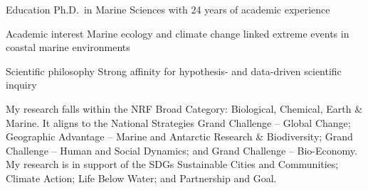


\begin{cvskills}


\cvskill
{Education} %
{Ph.D.~in Marine Sciences with 24 years of academic experience} %


\cvskill
{Academic interest} %
{Marine ecology and climate change linked extreme events in coastal marine environments} %


\cvskill
{Scientific philosophy} %
{Strong affinity for hypothesis- and data-driven scientific inquiry} %


\end{cvskills}

My research falls within the NRF Broad Category: Biological, Chemical, Earth & Marine. It aligns to the National Strategies Grand Challenge – Global Change; Geographic Advantage – Marine and Antarctic Research \& Biodiversity; Grand Challenge – Human and Social Dynamics; and Grand Challenge – Bio-Economy. My research is in support of the SDGs Sustainable Cities and Communities; Climate Action; Life Below Water; and Partnership and Goal.
